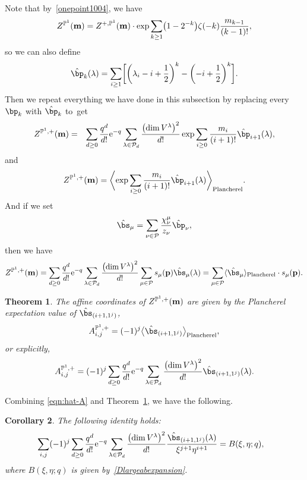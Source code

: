 \documentclass[pdftex]{sigma}
\newcommand{\corr}[1]{\langle {#1} \rangle}
\newcommand{\Corr}[1]{\biggl\langle {#1} \biggr\rangle}
\newcommand{\bP}{\mathbb{P}}
\newcommand{\half}{\frac{1}{2}}
\newcommand{\ben}{\begin{eqnarray*}}
\newcommand{\een}{\end{eqnarray*}}
\numberwithin{equation}{section}
\newtheorem{Theorem}{Theorem}[section]
\newtheorem{Corollary}[Theorem]{Corollary}
\begin{document}
Note that by~\eqref{onepoint1004},
we have
\[
Z^{\bP^1}({\bf m}) = Z^{+, \bP^1}({\bf m}) \cdot \exp \sum_{k \geq 1} \bigl(1-2^{-k}\bigr) \zeta(-k) \frac{m_{k-1}}{(k-1)!},
\]
so we can also define
\[
\hat{\bp}_k(\lambda)
= \sum_{i\geq 1}\biggl[\biggl(\lambda_i-i+\half\biggr)^k - \biggl(-i+\half\biggr)^k\biggr].
\]
Then we repeat everything we have done in this subsection %
by replacing
every $\bp_k$ with $\hat{\bp}_k$ to~get
\ben
Z^{\bP^1,+}({\bf m})
& = & \sum_{d\geq 0} \frac{q^d}{d!}{\rm e}^{-q}
\sum_{\lambda\in \mathcal{P}_d} \frac{\bigl(\dim V^\lambda\bigr)^2}{d!}
\exp \sum_{i\ge0} \frac{m_i}{(i+1)!} \hat{\bp}_{i+1}(\lambda),
\een
and
\[
Z^{\bP^1,+}({\bf m}) = \Corr{\exp \sum_{i\ge0} \frac{m_i}{(i+1)!}
 \hat{\bp}_{i+1}(\lambda)}_{\rm Plancherel}.
\]
And if we set
\[
\hat{\bs}_\mu = \sum_{\nu\in\mathcal{P}} \frac{\chi^\mu_\nu}{z_\nu} \hat{\bp}_\nu,
\]
then we have
\begin{align*}
Z^{\bP^1, +}({\bf m}) = \sum_{d\geq 0} \frac{q^d}{d!}{\rm e}^{-q}
\sum_{\lambda\in \mathcal{P}_d} \frac{\bigl(\dim V^\lambda\bigr)^2}{d!}
 \sum_{\mu\in\mathcal{P}} s_\mu({\bf p}) \hat{\bs}_{\mu}(\lambda)
 = \sum_{\mu\in\mathcal{P}} \corr{\hat{\bs}_\mu}_{\rm Plancherel} \cdot s_\mu({\bf p}).
\end{align*}

\begin{Theorem}\label{affinemeasure2}
The affine coordinates \smash{$A_{i,j}^{\bP^1, +}$} of $Z^{\bP^1,+}({\bf m})$ are given by the Plancherel expectation value
of $\hat{\bs}_{(i+1, 1^j)}$,
\[
A_{i,j}^{\bP^1, +} = (-1)^j \bigl\langle\hat{\bs}_{(i+1,1^j)}\bigr\rangle_{\rm Plancherel},
\]
or explicitly,
\[
A_{i,j}^{\bP^1, +} = (-1)^j \sum_{d\geq 0} \frac{q^d}{d!}{\rm e}^{-q}
\sum_{\lambda\in \mathcal{P}_d} \frac{\bigl(\dim V^\lambda\bigr)^2}{d!} \hat{\bs}_{(i+1,1^j)}(\lambda).
\]
\end{Theorem}

Combining \eqref{eqn:hat-A} and Theorem~\ref{affinemeasure2}, we have the following.
\begin{Corollary} \label{cor:Plancherel}
The following identity holds:
\begin{align}
&\sum_{i,j} (-1)^j \sum_{d\geq 0} \frac{q^d}{d!}{\rm e}^{-q}
\sum_{\lambda\in \mathcal{P}_d} \frac{\bigl(\dim V^\lambda\bigr)^2}{d!} \frac{\hat{\bs}_{(i+1,1^j)}(\lambda)}{\xi^{j+1} \eta^{i+1}} = B(\xi,\eta;q), \label{id21004}
\end{align}
where $B(\xi,\eta;q)$ is given by~\eqref{Dlargeabexpansion}.
\end{Corollary}
\end{document}
